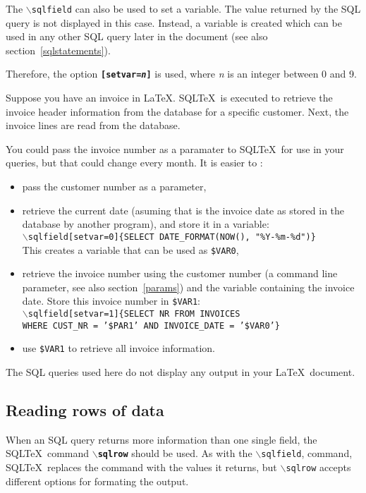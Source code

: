 \documentclass{article}
\newcommand{\bs}{\ensuremath{\backslash}}
\newcommand{\vs}{\vspace{3mm}}
\begin{document}
The \texttt{\bs sqlfield} can also be used to set a variable. The value returned by the SQL query is not
displayed in this case. Instead, a variable is created which can be used in any other SQL query later in
the document (see also section~\ref{sqlstatements}).

Therefore, the option \texttt{\textbf{[setvar=\textit{n}]}} is used, where \textit{n} is an integer between
0 and 9.

\vs

Suppose you have an invoice in \LaTeX. SQL\TeX\ is executed to retrieve the invoice header information
from the database for a specific customer. Next, the invoice lines are read from the database.

You could pass the invoice number as a paramater to SQL\TeX\ for use in your queries, but that could
change every month. It is easier to :\\
\begin{itemize}
\item pass the customer number as a parameter,
\item retrieve the current date (asuming that is the invoice date as stored in
the database by another program), and store it in a variable: \\
\texttt{\bs sqlfield[setvar=0]\{SELECT DATE\_FORMAT(NOW(), "\%Y-\%m-\%d")\}} \\
This creates a variable that can be used as \texttt{\$VAR0},
\item retrieve the invoice number using the customer number (a command line parameter,
see also section~\ref{params}) and the variable containing the invoice date.
Store this invoice number in \texttt{\$VAR1}: \\
\texttt{\bs sqlfield[setvar=1]\{SELECT NR FROM INVOICES \\
WHERE CUST\_NR = '\$PAR1' AND INVOICE\_DATE = '\$VAR0'\}}
\item use \texttt{\$VAR1} to retrieve all invoice information.
\end{itemize}

\vs

The SQL queries used here do not display any output in your \LaTeX\ document.


\subsection{Reading rows of data}\label{sqlrow}

When an SQL query returns more information than one single field, the SQL\TeX\
command \texttt{\textbf{\bs sqlrow}} should be used. As with the \texttt{\bs sqlfield},
command, SQL\TeX\ replaces the command with the values it returns, but \texttt{\bs sqlrow}
accepts different options for formating the output.
\end{document}
